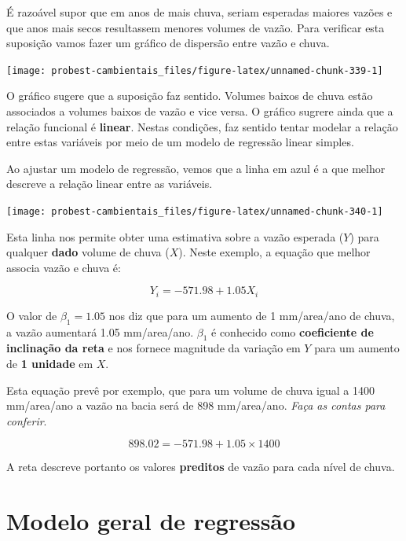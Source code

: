 \documentclass[
]{book}
\begin{document}
É razoável supor que em anos de mais chuva, seriam esperadas maiores vazões e que anos mais secos resultassem menores volumes de vazão. Para verificar esta suposição vamos fazer um gráfico de dispersão entre vazão e chuva.

\begin{center}\texttt{[image: probest-cambientais\_files/figure-latex/unnamed-chunk-339-1]} \end{center}

O gráfico sugere que a suposição faz sentido. Volumes baixos de chuva estão associados a volumes baixos de vazão e vice versa. O gráfico sugrere ainda que a relação funcional é \textbf{linear}. Nestas condições, faz sentido tentar modelar a relação entre estas variáveis por meio de um modelo de regressão linear simples.

Ao ajustar um modelo de regressão, vemos que a linha em azul é a que melhor descreve a relação linear entre as variáveis.

\begin{center}\texttt{[image: probest-cambientais\_files/figure-latex/unnamed-chunk-340-1]} \end{center}

Esta linha nos permite obter uma estimativa sobre a vazão esperada (\(Y\)) para qualquer \textbf{dado} volume de chuva (\(X\)). Neste exemplo, a equação que melhor associa vazão e chuva é:

\[Y_i = -571.98 + 1.05 X_i\]

O valor de \(\beta_1 = 1.05\) nos diz que para um aumento de 1 mm/area/ano de chuva, a vazão aumentará 1.05 mm/area/ano. \(\beta_1\) é conhecido como \textbf{coeficiente de inclinação da reta} e nos fornece magnitude da variação em \(Y\) para um aumento de \textbf{1 unidade} em \(X\).

Esta equação prevê por exemplo, que para um volume de chuva igual a 1400 mm/area/ano a vazão na bacia será de 898 mm/area/ano. \emph{Faça as contas para conferir}.

\[898.02 = -571.98 + 1.05 \times 1400\]

A reta descreve portanto os valores \textbf{preditos} de vazão para cada nível de chuva.

\hypertarget{modelo-geral-de-regressuxe3o}{%
\section{Modelo geral de regressão}\label{modelo-geral-de-regressuxe3o}}
\end{document}
